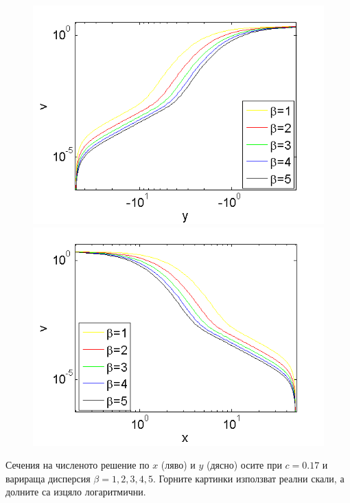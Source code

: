 \documentclass{beamer}
\begin{document}
\begin{frame}
\begin{figure}[ht]
\begin{minipage}[b]{0.45\linewidth}
		\raggedleft
		\includegraphics[width=\linewidth]{../Thesis/SolutionProfiles/ChristovIVLogX=0_ZB2_bt1_5_c017_h020_O(h^6).png}
	\end{minipage}	
	\begin{minipage}[b]{0.45\linewidth}
		\raggedright
		 \includegraphics[width=\linewidth]{../Thesis/SolutionProfiles/ChristovIVLogY=0_ZB2_bt1_5_c017_h020_O(h^6).png}
	\end{minipage}
	\label{profilesDispVarying}
\end{figure}
Сечения на численото решение по $x$ (ляво) и $y$ (дясно) осите при $c=0.17$ и варираща дисперсия $\beta=1,2,3,4,5$. Горните картинки използват реални скали, а долните са изцяло логаритмични.
\end{frame}
\end{document}
